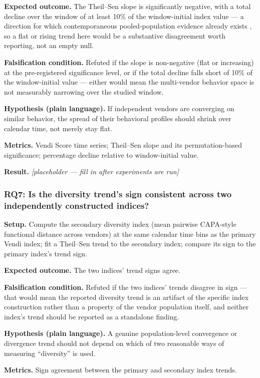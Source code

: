 \documentclass[11pt]{article}
\newcommand{\ph}{\textit{[placeholder --- fill in after experiments are run]}}
\begin{document}
\textbf{Expected outcome.} The Theil--Sen slope is significantly negative, with a total decline over the window of at least 10\% of the window-initial index value --- a direction for which contemporaneous pooled-population evidence already exists \citep{SimilarlyCreative2608}, so a flat or rising trend here would be a substantive disagreement worth reporting, not an empty null.

\textbf{Falsification condition.} Refuted if the slope is non-negative (flat or increasing) at the pre-registered significance level, or if the total decline falls short of 10\% of the window-initial value --- either would mean the multi-vendor behavior space is not measurably narrowing over the studied window.

\textbf{Hypothesis (plain language).} If independent vendors are converging on similar behavior, the spread of their behavioral profiles should shrink over calendar time, not merely stay flat.

\textbf{Metrics.} Vendi Score time series; Theil--Sen slope and its permutation-based significance; percentage decline relative to window-initial value.

\textbf{Result.} \ph

\subsubsection{RQ7: Is the diversity trend's sign consistent across two independently constructed indices?}
\textbf{Setup.} Compute the secondary diversity index (mean pairwise CAPA-style functional distance across vendors) at the same calendar time bins as the primary Vendi index; fit a Theil--Sen trend to the secondary index; compare its sign to the primary index's trend sign.

\textbf{Expected outcome.} The two indices' trend signs agree.

\textbf{Falsification condition.} Refuted if the two indices' trends disagree in sign --- that would mean the reported diversity trend is an artifact of the specific index construction rather than a property of the vendor population itself, and neither index's trend should be reported as a standalone finding.

\textbf{Hypothesis (plain language).} A genuine population-level convergence or divergence trend should not depend on which of two reasonable ways of measuring ``diversity'' is used.

\textbf{Metrics.} Sign agreement between the primary and secondary index trends.
\end{document}
